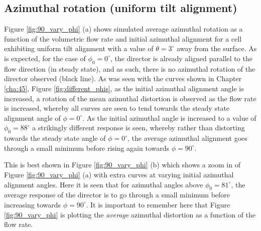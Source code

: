 \subsection{Azimuthal rotation (uniform tilt alignment)}
Figure \ref{fig:90_vary_phi} (a) shows simulated average azimuthal rotation as a function of the volumetric flow rate and initial azimuthal alignment for a cell exhibiting uniform tilt alignment with a value of $\theta=3^{\circ}$ away from the surface. As is expected, for the case of $\phi_0=0^{\circ}$, the director is already aligned parallel to the flow direction (in steady state), and as such, there is no azimuthal rotation of the director observed (black line). As was seen with the curves shown in Chapter \ref{cha:45}, Figure \ref{fig:different_phis}, as the initial azimuthal alignment angle is increased, a rotation of the mean azimuthal distortion is observed as the flow rate is increased, whereby all curves are seen to tend towards the steady state alignment angle of $\phi=0^{\circ}$. As the initial azimuthal angle is increased to a value of $\phi_0=88^{\circ}$ a strikingly different response is seen, whereby rather than distorting towards the steady state angle of $\phi=0^{\circ}$, the average azimuthal alignment goes through a small minimum before rising again towards $\phi=90^{\circ}$. 

This is best shown in Figure \ref{fig:90_vary_phi} (b) which shows a zoom in of Figure \ref{fig:90_vary_phi} (a) with extra curves at varying initial azimuthal alignment angles. Here it is seen that for azimuthal angles above $\phi_0=81^{\circ}$, the average response of the director is to go through a small minimum before increasing towards $\phi=90^{\circ}$. It is important to remember here that Figure \ref{fig:90_vary_phi} is plotting the \textit{average} azimuthal distortion as a function of the flow rate.

